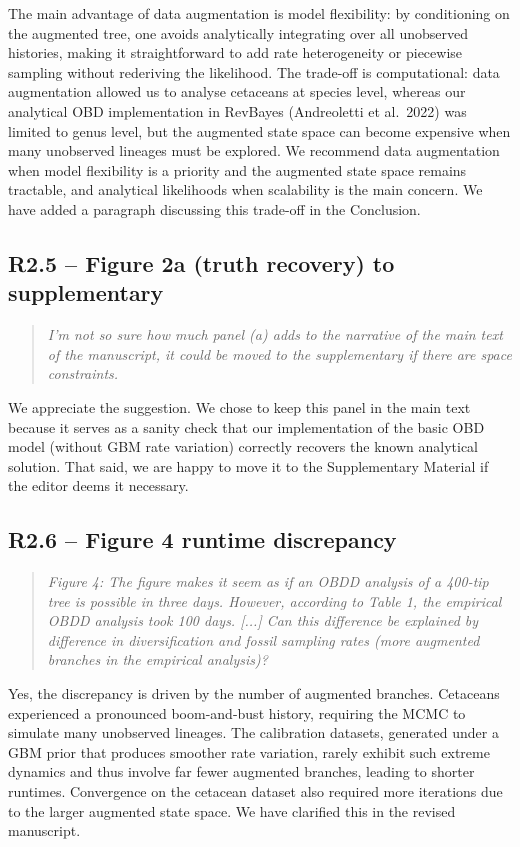 \documentclass[11pt]{article}
\newenvironment{RC}{\begin{quote}\itshape}{\end{quote}}
\newcommand{\response}[1]{\noindent\textcolor{resp}{#1}\medskip}
\begin{document}
\response{The main advantage of data augmentation is model flexibility: by conditioning on the augmented tree, one avoids analytically integrating over all unobserved histories, making it straightforward to add rate heterogeneity or piecewise sampling without rederiving the likelihood. The trade-off is computational: data augmentation allowed us to analyse cetaceans at species level, whereas our analytical OBD implementation in RevBayes (Andreoletti et al.\ 2022) was limited to genus level, but the augmented state space can become expensive when many unobserved lineages must be explored. We recommend data augmentation when model flexibility is a priority and the augmented state space remains tractable, and analytical likelihoods when scalability is the main concern. We have added a paragraph discussing this trade-off in the Conclusion.}

\subsection*{R2.5 -- Figure 2a (truth recovery) to supplementary}

\begin{RC}
I'm not so sure how much panel (a) adds to the narrative of the main text of the manuscript, it could be moved to the supplementary if there are space constraints.
\end{RC}

\response{We appreciate the suggestion. We chose to keep this panel in the main text because it serves as a sanity check that our implementation of the basic OBD model (without GBM rate variation) correctly recovers the known analytical solution. That said, we are happy to move it to the Supplementary Material if the editor deems it necessary.}

\subsection*{R2.6 -- Figure 4 runtime discrepancy}

\begin{RC}
Figure 4: The figure makes it seem as if an OBDD analysis of a 400-tip tree is possible in three days. However, according to Table 1, the empirical OBDD analysis took 100 days. [...] Can this difference be explained by difference in diversification and fossil sampling rates (more augmented branches in the empirical analysis)?
\end{RC}

\response{Yes, the discrepancy is driven by the number of augmented branches. Cetaceans experienced a pronounced boom-and-bust history, requiring the MCMC to simulate many unobserved lineages. The calibration datasets, generated under a GBM prior that produces smoother rate variation, rarely exhibit such extreme dynamics and thus involve far fewer augmented branches, leading to shorter runtimes. Convergence on the cetacean dataset also required more iterations due to the larger augmented state space. We have clarified this in the revised manuscript.}
\end{document}
